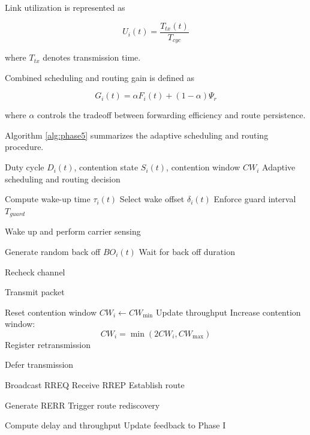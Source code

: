 \documentclass[a4paper,fleqn,final,1p]{cas-dc}
\numberwithin{equation}{section}
\begin{document}
Link utilization is represented as

\begin{equation}
U_i(t)=
\frac{T_{tx}(t)}
{T_{cyc}}
\label{eq:utilization}
\end{equation}

where $T_{tx}$ denotes transmission time.

Combined scheduling and routing gain is defined as

\begin{equation}
G_i(t)=
\alpha F_i(t)+
(1-\alpha)\Psi_r
\label{eq:gain}
\end{equation}

where $\alpha$ controls the tradeoff between forwarding efficiency and route persistence.

Algorithm \ref{alg:phase5} summarizes the adaptive scheduling and routing procedure.

\begin{algorithm}[H]
\caption{Phase V: Adaptive Scheduling and AODV Routing}
\label{alg:phase5}
\begin{algorithmic}[1]

\Require Duty cycle $D_i(t)$, contention state $S_i(t)$, contention window $CW_i$
\Ensure Adaptive scheduling and routing decision


\State Compute wake-up time $\tau_i(t)$
\State Select wake offset $\delta_i(t)$
\State Enforce guard interval $T_{guard}$

\State Wake up and perform carrier sensing


\State Generate random back off $BO_i(t)$
\State Wait for back off duration

\State Recheck channel

\State Transmit packet

\State Reset contention window $CW_i \gets CW_{\min}$
\State Update throughput
\Else
\State Increase contention window:
\[
CW_i = \min(2CW_i, CW_{\max})
\]
\State Register retransmission
\EndIf

\EndIf

\Else
\State Defer transmission
\EndIf

\State Broadcast RREQ
\State Receive RREP
\State Establish route
\EndIf

\State Generate RERR
\State Trigger route rediscovery
\EndIf

\State Compute delay and throughput
\State Update feedback to Phase I

\EndFor

\end{algorithmic}
\end{algorithm}
\end{document}

